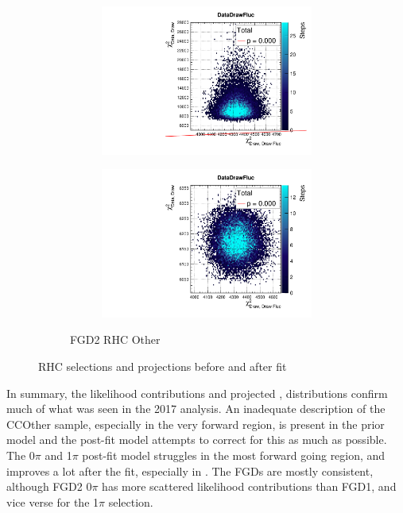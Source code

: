 \begin{figure}[h]
\begin{subfigure}[t]{\textwidth}
\begin{subfigure}[t]{0.24\textwidth}
			\includegraphics[width=\textwidth, trim={0mm 0mm 0mm 8mm}, clip,page=164]{figures/mach3/2018/data/2018a_FixedCov_RedCov_Mpi_Data_merge_PriorPred_procs}
		\end{subfigure}
		\begin{subfigure}[t]{0.24\textwidth}
			\includegraphics[width=\textwidth, trim={0mm 0mm 0mm 8mm}, clip,page=164]{figures/mach3/2018/data/2018a_FixedCov_RedCov_Mpi_Data_merge_PostPredStore_FullLLH_procs}
		\end{subfigure}
		\caption{FGD2 \numu RHC Other}
	\end{subfigure}
	\caption{RHC \numu selections \pmu and \cosmu projections before and after fit}
	\label{fig:fhc_postfit_other_numuRHC_2018}
\end{figure}

In summary, the likelihood contributions and projected \pmu, \cosmu distributions confirm much of what was seen in the 2017 analysis. An inadequate description of the CCOther sample, especially in the very forward region, is present in the prior model and the post-fit model attempts to correct for this as much as possible. The 0$\pi$ and 1$\pi$ post-fit model struggles in the most forward going region, and improves a lot after the fit, especially in \pmu. The FGDs are mostly consistent, although FGD2 0$\pi$ has more scattered likelihood contributions than FGD1, and vice verse for the 1$\pi$ selection.

